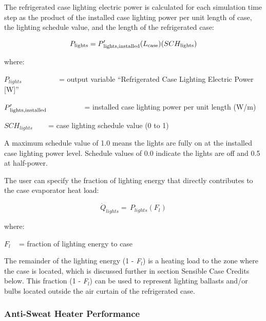 The refrigerated case lighting electric power is calculated for each simulation time step as the product of the installed case lighting power per unit length of case, the lighting schedule value, and the length of the refrigerated case:

\begin{equation}
{P_{{\rm{lights}}}} = P{'_{{\rm{lights,  installed}}}}({L_{{\rm{case}}}})(SC{H_{{\rm{lights}}}})
\end{equation}

where:

\({P_{lights}}\) ~~~~~~~~~ = output variable ``Refrigerated Case Lighting Electric Power {[}W{]}''

\(P{'_{{\rm{lights, installed}}}}\) ~~~~~~~~~ = installed case lighting power per unit length (W/m)

\(SC{H_{lights}}\) ~~~ = case lighting schedule value (0 to 1)

A maximum schedule value of 1.0 means the lights are fully on at the installed case lighting power level. Schedule values of 0.0 indicate the lights are off and 0.5 at half-power.

The user can specify the fraction of lighting energy that directly contributes to the case evaporator heat load:

\begin{equation}
{\dot Q_{lights}} = \,{P_{lights}}\left( {{F_l}} \right)
\end{equation}

where:

\({F_l}\) ~ = fraction of lighting energy to case

The remainder of the lighting energy (1 - \emph{F\(_{l}\)}) is a heating load to the zone where the case is located, which is discussed further in section Sensible Case Credits below. This fraction (1 - \emph{F\(_{l}\)}) can be used to represent lighting ballasts and/or bulbs located outside the air curtain of the refrigerated case.

\subsubsection{Anti-Sweat Heater Performance}\label{anti-sweat-heater-performance}

